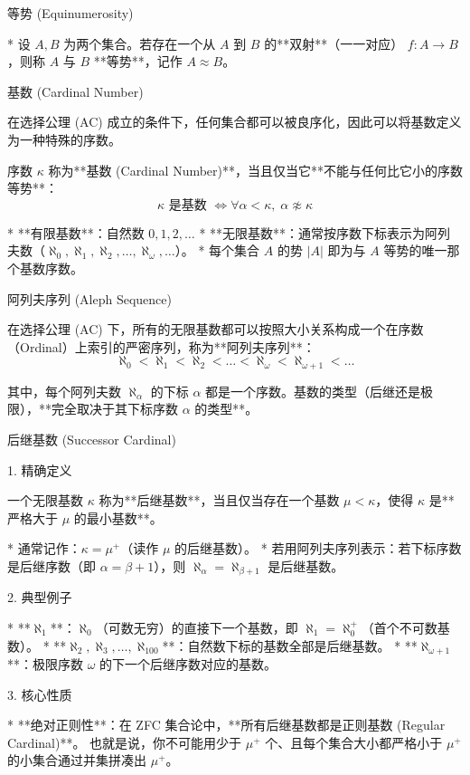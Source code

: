 \documentclass{beamer}
\begin{document}
\begin{frame}[fragile]{等势 (Equinumerosity)}
\begin{markdown}
* 设 $A, B$ 为两个集合。若存在一个从 $A$ 到 $B$ 的**双射**（一一对应） $f: A \to B$，则称 $A$ 与 $B$ **等势**，记作 $A \approx B$。
\end{markdown}
\end{frame}

\begin{frame}[fragile]{基数 (Cardinal Number)}
\begin{markdown}
在选择公理 (AC) 成立的条件下，任何集合都可以被良序化，因此可以将基数定义为一种特殊的序数。

\smallskip
序数 $\kappa$ 称为**基数 (Cardinal Number)**，当且仅当它**不能与任何比它小的序数等势**：
$$\kappa \text{ 是基数 } \iff \forall \alpha < \kappa, \; \alpha \not\approx \kappa$$

* **有限基数**：自然数 $0, 1, 2, \dots$
* **无限基数**：通常按序数下标表示为阿列夫数（$\aleph_0, \aleph_1, \aleph_2, \dots, \aleph_\omega, \dots$）。
* 每个集合 $A$ 的势 $\vert{}A\vert{}$ 即为与 $A$ 等势的唯一那个基数序数。
\end{markdown}
\end{frame}

\begin{frame}[fragile]{阿列夫序列 (Aleph Sequence)}
\begin{markdown}
在选择公理 (AC) 下，所有的无限基数都可以按照大小关系构成一个在序数（Ordinal）上索引的严密序列，称为**阿列夫序列**：
$$\aleph_0 < \aleph_1 < \aleph_2 < \dots < \aleph_\omega < \aleph_{\omega+1} < \dots$$

其中，每个阿列夫数 $\aleph_\alpha$ 的下标 $\alpha$ 都是一个序数。基数的类型（后继还是极限），**完全取决于其下标序数 $\alpha$ 的类型**。
\end{markdown}
\end{frame}

\begin{frame}[fragile]{ 后继基数 (Successor Cardinal)}
\begin{markdown}
1. 精确定义

一个无限基数 $\kappa$ 称为**后继基数**，当且仅当存在一个基数 $\mu < \kappa$，使得 $\kappa$ 是**严格大于 $\mu$ 的最小基数**。

* 通常记作：$\kappa = \mu^+$（读作 $\mu$ 的后继基数）。
* 若用阿列夫序列表示：若下标序数是后继序数（即 $\alpha = \beta + 1$），则 $\aleph_\alpha = \aleph_{\beta+1}$ 是后继基数。

2. 典型例子

* **$\aleph_1$**：$\aleph_0$（可数无穷）的直接下一个基数，即 $\aleph_1 = \aleph_0^+$（首个不可数基数）。
* **$\aleph_2, \aleph_3, \dots, \aleph_{100}$**：自然数下标的基数全部是后继基数。
* **$\aleph_{\omega+1}$**：极限序数 $\omega$ 的下一个后继序数对应的基数。

3. 核心性质

* **绝对正则性**：在 ZFC 集合论中，**所有后继基数都是正则基数 (Regular Cardinal)**。
也就是说，你不可能用少于 $\mu^+$ 个、且每个集合大小都严格小于 $\mu^+$ 的小集合通过并集拼凑出 $\mu^+$。
\end{markdown}
\end{frame}
\end{document}
